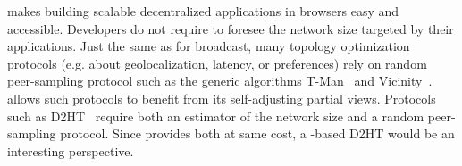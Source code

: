 \SPRAY makes building scalable decentralized applications in browsers easy and
accessible.  Developers do not require to foresee the network size targeted by
their applications. Just the same as for broadcast, many topology optimization
protocols (e.g. about geolocalization, latency, or preferences) rely on random
peer-sampling protocol such as the generic algorithms
T-Man~\cite{jelasity2009tman} and Vicinity~\cite{voulgaris2005epidemic}. \SPRAY
allows such protocols to benefit from its self-adjusting partial
views. Protocols such as D2HT~\cite{bertier-d2ht} require both an estimator of
the network size and a random peer-sampling protocol. Since \SPRAY provides both
at same cost, a \SPRAY-based D2HT would be an interesting perspective.









